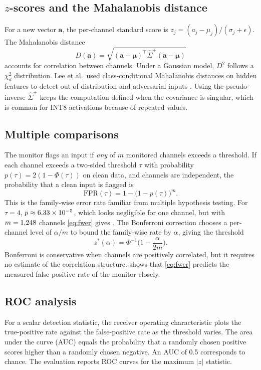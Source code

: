 \subsection{$z$-scores and the Mahalanobis distance}
For a new vector $\mathbf{a}$, the per-channel standard score is
$z_j = (a_j - \mu_j)/(\sigma_j+\epsilon)$. The Mahalanobis distance \cite{mahalanobis1936}
\begin{equation}
  D(\mathbf{a}) = \sqrt{(\mathbf{a}-\boldsymbol\mu)^\top \hat\Sigma^{+} (\mathbf{a}-\boldsymbol\mu)}
  \label{eq:mahal_bg}
\end{equation}
accounts for correlation between channels. Under a Gaussian model, $D^2$ follows a
$\chi^2_d$ distribution. Lee et al.\ used class-conditional Mahalanobis distances on hidden
features to detect out-of-distribution and adversarial inputs \cite{lee2018simple}. Using the
pseudo-inverse $\hat\Sigma^{+}$ keeps the computation defined when the covariance is singular,
which is common for INT8 activations because of repeated values.

\subsection{Multiple comparisons}
\label{sec:bg:multiple}
The monitor flags an input if \emph{any} of $m$ monitored channels exceeds a threshold. If each
channel exceeds a two-sided threshold $\tau$ with probability $p(\tau)=2(1-\Phi(\tau))$ on clean
data, and channels are independent, the probability that a clean input is flagged is
\begin{equation}
  \mathrm{FPR}(\tau) = 1 - \big(1 - p(\tau)\big)^{m}.
  \label{eq:fwer}
\end{equation}
This is the family-wise error rate familiar from multiple hypothesis testing. For $\tau=4$,
$p\approx6.33\times 10^{-5}$, which looks negligible for one channel, but with $m=1{,}248$
channels \cref{eq:fwer} gives \PredFPRZFour{}. The Bonferroni correction \cite{dunn1961multiple}
chooses a per-channel level of $\alpha/m$ to bound the family-wise rate by $\alpha$, giving the
threshold
\begin{equation}
  z^*(\alpha) = \Phi^{-1}\!\Big(1 - \frac{\alpha}{2m}\Big).
  \label{eq:bonf}
\end{equation}
Bonferroni is conservative when channels are positively correlated, but it requires no
estimate of the correlation structure.  shows that \cref{eq:fwer}
predicts the measured false-positive rate of the monitor closely.

\subsection{ROC analysis}
For a scalar detection statistic, the receiver operating characteristic plots the true-positive
rate against the false-positive rate as the threshold varies. The area under the curve (AUC)
equals the probability that a randomly chosen positive scores higher than a randomly chosen
negative. An AUC of 0.5 corresponds to chance. The evaluation reports ROC curves for the
maximum $|z|$ statistic.
